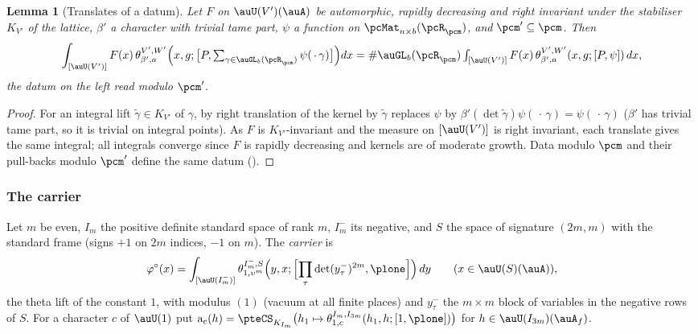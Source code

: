 \documentclass[10pt]{amsart}
\newtheorem{lemma}[theorem]{Lemma}
\theoremstyle{definition}
\theoremstyle{remark}
\begin{document}
\begin{lemma}[Translates of a datum]\label{pte:translates}
Let $F$ on $\auU(V')(\auA)$ be automorphic, rapidly decreasing and right invariant under the
stabiliser $K_{V'}$ of the lattice, $\beta'$ a character with trivial tame part, $\psi$ a function on
$\pcMat_{n\times b}(\pcR_\pcm)$, and $\pcm'\subseteq\pcm$. Then
\[
\int_{[\auU(V')]}F(x)\,\theta^{V',W'}_{\beta',a}\Bigl(x,g;\bigl[P,\textstyle\sum_{\gamma\in\auGL_b(\pcR_\pcm)}\psi(\,\cdot\,\gamma)
\bigr]\Bigr)dx=\#\auGL_b(\pcR_\pcm)\int_{[\auU(V')]}F(x)\,\theta^{V',W'}_{\beta',a}(x,g;[P,\psi])\,dx,
\]
the datum on the left read modulo $\pcm'$.
\end{lemma}
\begin{proof}
For an integral lift $\tilde\gamma\in K_{V'}$ of $\gamma$, by {\cite[Lemma~2.9]{P53}} right translation
of the kernel by $\tilde\gamma$ replaces $\psi$ by $\beta'(\det\tilde\gamma)\psi(\,\cdot\,\gamma)=
\psi(\,\cdot\,\gamma)$ ($\beta'$ has trivial tame part, so it is trivial on integral points). As $F$ is
$K_{V'}$-invariant and the measure on $[\auU(V')]$ is right invariant, each translate gives the same
integral; all integrals converge since $F$ is rapidly decreasing and kernels are of moderate growth.
Data modulo $\pcm$ and their pull-backs modulo $\pcm'$ define the same datum ({\cite[Lemma~3.24]{P53}}).
\end{proof}

\subsubsection{The carrier}\label{pte:ss-carrier}

Let $m$ be even, $I_m$ the positive definite standard space of rank $m$, $I_m^-$ its negative, and $S$
the space of signature $(2m,m)$ with the standard frame (signs $+1$ on $2m$ indices, $-1$ on $m$). The
\emph{carrier} is
\[
\varphi^\circ(x)=\int_{[\auU(I_m^-)]}\theta^{I_m^-,S}_{1,\upsilon^m}\Bigl(y,x;\Bigl[\prod_\tau\det(y^-_\tau)^{2m},\plone\Bigr]\Bigr)\,dy
\qquad(x\in\auU(S)(\auA)),
\]
the theta lift of the constant $1$, with modulus $(1)$ (vacuum at all finite places) and $y^-_\tau$ the
$m\times m$ block of variables in the negative rows of $S$. For a character $c$ of $\auU(1)$ put
$\mathrm a_c(h)=\pteCS_{K_{I_m}}\bigl(h_1\mapsto\theta^{I_m,I_{3m}}_{1,c}(h_1,h;[1,\plone])\bigr)$ for
$h\in\auU(I_{3m})(\auA_f)$.
\end{document}
